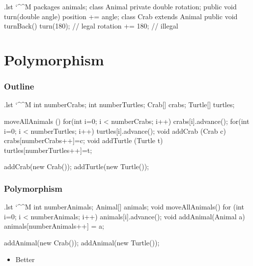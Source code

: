 \documentclass[10pt,handout]{beamer}
\makeatletter
\newenvironment{code}{%
  \begingroup
  \@bsphack
  \immediate\openout\lstvrb@out\jobname.lst
  \let\do\@makeother\dospecials\catcode`\^^M\active
  \def\verbatim@processline{%
    \immediate\write\lstvrb@out{\the\verbatim@line}}%
  \verbatim@start}{%
  \immediate\closeout\lstvrb@out
  \@esphack
  \endgroup
  
  \begin{alertblock}{}
    
  \end{alertblock}}
\makeatother
\begin{document}
\begin{frame}[fragile]
\begin{code}
packages animals;
class Animal {
  private double rotation;
  public void turn(double angle)
    {position += angle;} 
}
class Crab extends Animal {
  public void turnBack() {
    turn(180);       // legal
    rotation += 180; // illegal
  }
}
\end{code}
\end{frame}

\section{Polymorphism}
\begin{frame}
  \frametitle{Outline}
  \tableofcontents[currentsection]
\end{frame}

\begin{frame}
  \begin{itemize}
  \end{itemize}
    \begin{code}
  int numberCrabs; int numberTurtles;
  Crab[] crabs;
  Turtle[] turtles;
  
  moveAllAnimals () {
    for(int i=0; i < numberCrabs; i++)
      crabs[i].advance();
    for(int i=0; i < numberTurtles; i++)
      turtles[i].advance();
  }
  void addCrab (Crab c) {crabs[numberCrabs++]=c;}
  void addTurtle (Turtle t) 
    {turtles[numberTurtles++]=t;}
  
  addCrab(new Crab());
  addTurtle(new Turtle());
    \end{code}
\end{frame}

\begin{frame}[fragile]
  \frametitle{Polymorphism}

  \begin{code}
  int numberAnimals;
  Animal[] animals;
  void moveAllAnimals(){
    for (int i=0; i < numberAnimals; i++)
      animals[i].advance();
  }
  void addAnimal(Animal a)
    {animals[numberAnimals++] = a;} 
  
  addAnimal(new Crab());
  addAnimal(new Turtle());
  \end{code}

\begin{itemize}
    \item \alert{\huge{Better}}
\end{itemize}
\end{frame}
\end{document}
